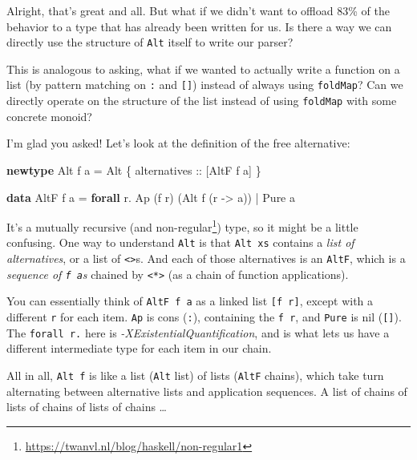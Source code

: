 \documentclass[]{article}
\newenvironment{Shaded}{}{}
\newcommand{\DataTypeTok}[1]{\textcolor[rgb]{0.56,0.13,0.00}{#1}}
\newcommand{\KeywordTok}[1]{\textcolor[rgb]{0.00,0.44,0.13}{\textbf{#1}}}
\newcommand{\NormalTok}[1]{#1}
\newcommand{\OperatorTok}[1]{\textcolor[rgb]{0.40,0.40,0.40}{#1}}
\newcommand{\OtherTok}[1]{\textcolor[rgb]{0.00,0.44,0.13}{#1}}
\renewcommand{\href}[2]{#2\footnote{\url{#1}}}
\begin{document}
Alright, that's great and all. But what if we didn't want to offload 83\% of the
behavior to a type that has already been written for us. Is there a way we can
directly use the structure of \texttt{Alt} itself to write our parser?

This is analogous to asking, what if we wanted to actually write a function on a
list (by pattern matching on \texttt{:} and \texttt{{[}{]}}) instead of always
using \texttt{foldMap}? Can we directly operate on the structure of the list
instead of using \texttt{foldMap} with some concrete monoid?

I'm glad you asked! Let's look at the definition of the free alternative:

\begin{Shaded}
\begin{Highlighting}[]
\KeywordTok{newtype} \DataTypeTok{Alt}\NormalTok{ f a }\OtherTok{=} \DataTypeTok{Alt}\NormalTok{ \{}\OtherTok{ alternatives ::}\NormalTok{ [}\DataTypeTok{AltF}\NormalTok{ f a] \}}

\KeywordTok{data} \DataTypeTok{AltF}\NormalTok{ f a }\OtherTok{=} \KeywordTok{forall}\NormalTok{ r}\OperatorTok{.} \DataTypeTok{Ap}\NormalTok{ (f r) (}\DataTypeTok{Alt}\NormalTok{ f (r }\OtherTok{{-}>}\NormalTok{ a))}
              \OperatorTok{|}           \DataTypeTok{Pure}\NormalTok{ a}
\end{Highlighting}
\end{Shaded}

It's a mutually recursive (and
\href{https://twanvl.nl/blog/haskell/non-regular1}{non-regular}) type, so it
might be a little confusing. One way to understand \texttt{Alt} is that
\texttt{Alt\ xs} contains a \emph{list of alternatives}, or a list of
\texttt{\textless{}\textbar{}\textgreater{}}s. And each of those alternatives is
an \texttt{AltF}, which is a \emph{sequence of \texttt{f\ a}s} chained by
\texttt{\textless{}*\textgreater{}} (as a chain of function applications).

You can essentially think of \texttt{AltF\ f\ a} as a linked list
\texttt{{[}f\ r{]}}, except with a different \texttt{r} for each item.
\texttt{Ap} is cons (\texttt{:}), containing the \texttt{f\ r}, and
\texttt{Pure} is nil (\texttt{{[}{]}}). The \texttt{forall\ r.} here is
\emph{-XExistentialQuantification}, and is what lets us have a different
intermediate type for each item in our chain.

All in all, \texttt{Alt\ f} is like a list (\texttt{Alt} list) of lists
(\texttt{AltF} chains), which take turn alternating between alternative lists
and application sequences. A list of chains of lists of chains of lists of
chains \ldots{}
\end{document}
